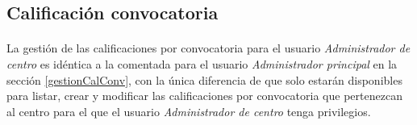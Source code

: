 \subsection{Calificación convocatoria}

  \paragraph{}La gestión de las calificaciones por convocatoria para el usuario
  \textit{Administrador de centro} es idéntica a la comentada para el usuario
  \textit{Administrador principal} en la sección \ref{gestionCalConv}, con la
  única diferencia de que solo estarán disponibles para listar, crear y
  modificar las calificaciones por convocatoria que pertenezcan al centro para
  el que el usuario \textit{Administrador de centro} tenga privilegios.